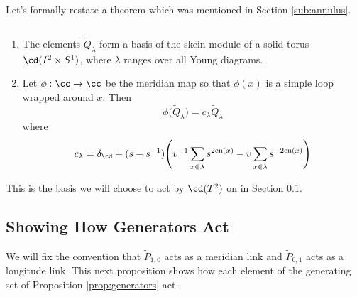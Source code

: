 Let's formally restate a theorem which was mentioned in Section \ref{sub:annulus}.

\begin{theorem}\label{thm:ann_basis} 
$\,$
\begin{enumerate}
    \item The elements $\widetilde{Q}_\lambda$ form a basis of the skein module of a solid torus $\cd(I^2 \times S^1)$, where $\lambda$ ranges over all Young diagrams. 
    \item Let $\phi: \cc \to \cc$ be the meridian map so that $\phi(x)$ is a simple loop wrapped around $x$. Then
    \[
        \phi \big( \widetilde{Q}_\lambda \big) = c_\lambda \widetilde{Q}_\lambda
    \]
    where 
        \[c_\lambda = \delta_\cd + (s - s^{-1}) \Bigg( v^{-1}\sum_{x \in \lambda} s^{2\cn(x)} - v\sum_{x \in \lambda} s^{-2\cn(x)} \Bigg)
    \]
\end{enumerate}
\end{theorem}

This is the basis we will choose to act by $\cd(T^2)$ on in Section \ref{sec:action}. 


\subsection{Showing How Generators Act} \label{sec:action}

We will fix the convention that $\widetilde{P}_{1,0}$ acts as a meridian link and $\widetilde{P}_{0,1}$ acts as a longitude link. This next proposition shows how each element of the generating set of Proposition \ref{prop:generators} act.

